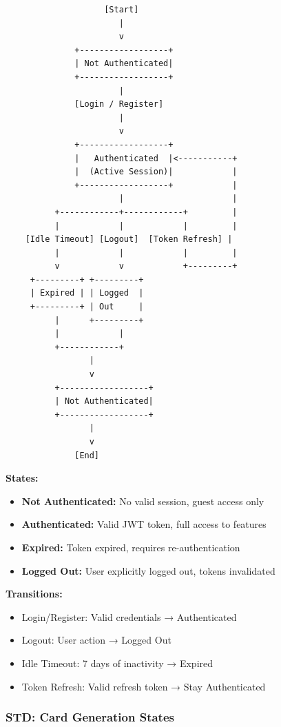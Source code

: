 \documentclass[12pt,a4paper]{article}
\begin{document}
\begin{verbatim}
                    [Start]
                       |
                       v
              +------------------+
              | Not Authenticated|
              +------------------+
                       |
              [Login / Register]
                       |
                       v
              +------------------+
              |   Authenticated  |<-----------+
              |  (Active Session)|            |
              +------------------+            |
                       |                      |
          +------------+------------+         |
          |            |            |         |
    [Idle Timeout] [Logout]  [Token Refresh] |
          |            |            |         |
          v            v            +---------+
     +---------+ +---------+
     | Expired | | Logged  |
     +---------+ | Out     |
          |      +---------+
          |            |
          +------------+
                 |
                 v
          +------------------+
          | Not Authenticated|
          +------------------+
                 |
                 v
              [End]
\end{verbatim}

\textbf{States:}
\begin{itemize}
    \item \textbf{Not Authenticated:} No valid session, guest access only
    \item \textbf{Authenticated:} Valid JWT token, full access to features
    \item \textbf{Expired:} Token expired, requires re-authentication
    \item \textbf{Logged Out:} User explicitly logged out, tokens invalidated
\end{itemize}

\textbf{Transitions:}
\begin{itemize}
    \item Login/Register: Valid credentials → Authenticated
    \item Logout: User action → Logged Out
    \item Idle Timeout: 7 days of inactivity → Expired
    \item Token Refresh: Valid refresh token → Stay Authenticated
\end{itemize}

\subsubsection{STD: Card Generation States}
\end{document}
